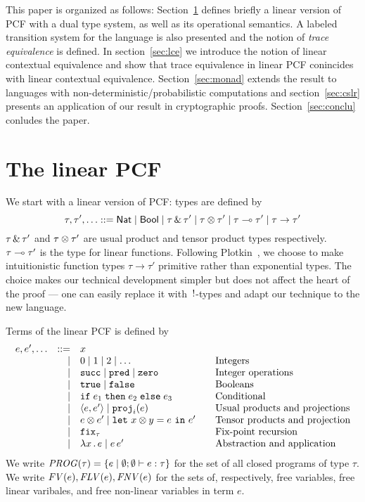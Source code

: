 \documentclass[10pt,a4]{article}
\begin{document}
This paper is organized as follows: Section~\ref{sec:linpcf} defines briefly a linear version of PCF 
with a dual type system, as well as its operational semantics. A labeled transition system for the 
language is also presented and the notion of {\em trace equivalence} is defined. 
In section~\ref{sec:lce} we introduce the notion of linear contextual equivalence and show that 
trace equivalence in linear PCF conincides with linear contextual equivalence. 
Section~\ref{sec:monad} extends the result to languages with non-deterministic/probabilistic 
computations and section~\ref{sec:cslr} presents an application of our result in cryptographic proofs. 
Section~\ref{sec:conclu} conludes the paper.

\section{The linear PCF}
\label{sec:linpcf}

We start with a linear version of PCF: types are defined by 
\[
\tau, \tau', \ldots ::= \mathsf{Nat} \mid \mathsf{Bool} \mid \tau \,\&\, \tau' \mid \tau \otimes \tau' 
\mid \tau \multimap \tau' \mid \tau \to \tau' 
\]
%
$\tau \,\&\, \tau'$ and $\tau \otimes \tau'$ are usual product and tensor product types respectively. 
$\tau \multimap \tau'$ is the type for linear functions. Following Plotkin~\cite{}, 
we choose to make intuitionistic function types $\tau \to \tau'$ primitive rather than exponential 
types. The choice makes our technical development simpler but does not affect the heart of the proof 
--- one can easily replace it with $\,!$-types and adapt our technique to the new language.

Terms of the linear PCF is defined by 
\[
\begin{array}{lrl@{\qquad}l}
e, e', \ldots 
& ::= & x & 
\\ 
& \mid & 0 \mid 1 \mid 2 \mid \ldots & \mbox{Integers}
\\
& \mid & \csucc \mid \cpred \mid \czero & \mbox{Integer operations}
\\
& \mid & \ctrue \mid \cfalse & \mbox{Booleans}
\\
& \mid & \cif{e_1}{e_2}{e_3} & \mbox{Conditional}
\\ 
& \mid & \cpair{e, e'} \mid \cproj_i(e) & \mbox{Usual products and projections}
\\
& \mid & e \otimes e' \mid \clet{x \otimes y}{e}{e'} & \mbox{Tensor products and projection}
\\
& \mid & \cfix_\tau& \mbox{Fix-point recursion}
\\
& \mid & \lambda x \ldot e \mid e \, e' & \mbox{Abstraction and application}
\end{array}
\]
%
We write $\mathit{PROG}(\tau) = \{{e \mid \emptyset ; \emptyset \vdash e : \tau }\}$ 
for the set of all closed programs of type $\tau$. 
We write $\mathit{FV}(e), \mathit{FLV}(e), \mathit{FNV}(e)$ for the sets of, respectively, free variables, 
free linear varibales, and free non-linear variables in term $e$.
\end{document}
